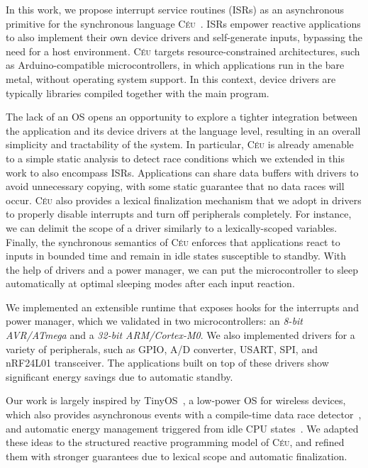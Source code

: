 \documentclass[sigplan,10pt,review,anonymous]{acmart}\settopmatter{printfolios=true,printccs=false,printacmref=false}
\newcommand{\CEU}{\textsc{C\'{e}u}\xspace}
\begin{document}
In this work, we propose interrupt service routines (ISRs) as an asynchronous
primitive for the synchronous language \CEU~\cite{ceu.sensys13}.
ISRs empower reactive applications to also implement their own device drivers
and self-generate inputs, bypassing the need for a host environment.
%
\CEU targets resource-constrained architectures, such as Arduino-compatible
microcontrollers, in which applications run in the bare metal, without
operating system support.
In this context, device drivers are typically libraries compiled together with
the main program.

The lack of an OS opens an opportunity to explore a tighter integration between
the application and its device drivers at the language level, resulting in an
overall simplicity and tractability of the system.
%
In particular, \CEU is already amenable to a simple static analysis to detect
race conditions which we extended in this work to also encompass ISRs.
Applications can share data buffers with drivers to avoid unnecessary copying,
with some static guarantee that no data races will occur.
%
\CEU also provides a lexical finalization mechanism that we adopt in drivers to
properly disable interrupts and turn off peripherals completely.
For instance, we can delimit the scope of a driver similarly to a
lexically-scoped variables.
%
Finally, the synchronous semantics of \CEU enforces that applications react
to inputs in bounded time and remain in idle states susceptible to standby.
With the help of drivers and a power manager, we can put the microcontroller to
sleep automatically at optimal sleeping modes after each input reaction.

We implemented an extensible runtime that exposes hooks for the interrupts and
power manager, which we validated in two microcontrollers: an
\emph{8-bit AVR/ATmega} and a \emph{32-bit ARM/Cortex-M0}.
%
We also implemented drivers for a variety of peripherals, such as GPIO, A/D
converter, USART, SPI, and nRF24L01 transceiver.
%
The applications built on top of these drivers show significant energy savings
due to automatic standby.

Our work is largely inspired by TinyOS~\cite{wsn.tos}, a low-power OS for
wireless devices, which also provides asynchronous events with a compile-time
data race detector~\cite{wsn.nesc}, and automatic energy management triggered
from idle CPU states~\cite{wsn.icem}.
%
We adapted these ideas to the structured reactive programming model of \CEU,
and refined them with stronger guarantees due to lexical scope and automatic
finalization.
\end{document}
